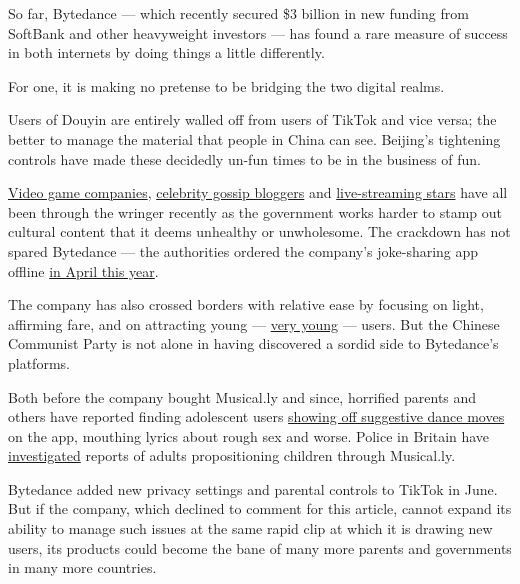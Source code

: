So far, Bytedance --- which recently secured \$3 billion in new funding
from SoftBank and other heavyweight investors --- has found a rare
measure of success in both internets by doing things a little
differently.

For one, it is making no pretense to be bridging the two digital realms.

Users of Douyin are entirely walled off from users of TikTok and vice
versa; the better to manage the material that people in China can see.
Beijing's tightening controls have made these decidedly un-fun times to
be in the business of fun.

\href{https://www.nytimes3xbfgragh.onion/2018/08/31/technology/china-videogames-myopia-tencent.html}{Video
game companies},
\href{https://www.nytimes3xbfgragh.onion/2017/06/09/world/asia/china-celebrity-news-wechat.html}{celebrity
gossip bloggers} and
\href{https://www.nytimes3xbfgragh.onion/2018/10/16/world/asia/china-yang-kaili-anthem.html}{live-streaming
stars} have all been through the wringer recently as the government
works harder to stamp out cultural content that it deems unhealthy or
unwholesome. The crackdown has not spared Bytedance --- the authorities
ordered the company's joke-sharing app offline
\href{https://www.nytimes3xbfgragh.onion/2018/04/11/technology/china-toutiao-bytedance-censor.html}{in
April this year}.

The company has also crossed borders with relative ease by focusing on
light, affirming fare, and on attracting young ---
\href{https://www.nytimes3xbfgragh.onion/2016/09/17/business/media/a-social-network-frequented-by-children-tests-the-limits-of-online-regulation.html}{very
young} --- users. But the Chinese Communist Party is not alone in having
discovered a sordid side to Bytedance's platforms.

Both before the company bought Musical.ly and since, horrified parents
and others have reported finding adolescent users
\href{https://medium.com/s/parenting-stories/porn-is-not-the-worst-thing-on-musical-ly-5df07ab842af}{showing
off suggestive dance moves} on the app, mouthing lyrics about rough sex
and worse. Police in Britain have
\href{http://www.edp24.co.uk/news/crime/police-investigation-after-two-children-from-eastgate-academy-in-king-s-lynn-allegedly-groomed-on-musical-ly-app-1-5036808}{investigated}
reports of adults propositioning children through Musical.ly.

Bytedance added new privacy settings and parental controls to TikTok in
June. But if the company, which declined to comment for this article,
cannot expand its ability to manage such issues at the same rapid clip
at which it is drawing new users, its products could become the bane of
many more parents and governments in many more countries.

